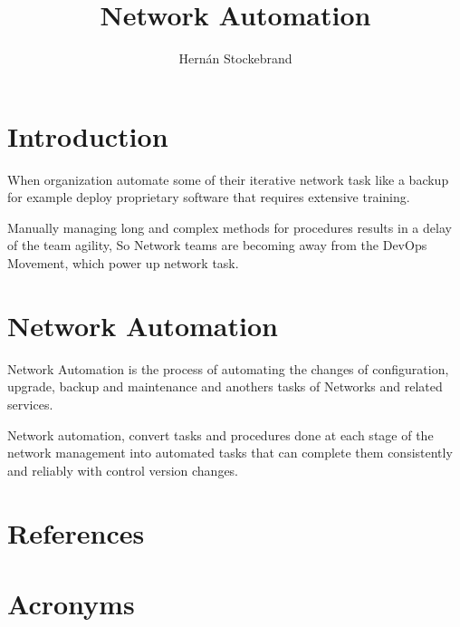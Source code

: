 \documentclass[PMO,lsstdraft,authoryear,toc]{lsstdoc}
\title{Network Automation}
\author{%
Hernán Stockebrand
}
\date{\vcsDate}
\begin{document}
\maketitle

\section{Introduction}

When organization automate some of their iterative network task like a backup for example deploy proprietary software that requires extensive training.

Manually managing long and complex methods for procedures results in a delay of the team agility, So Network teams are becoming away from the DevOps Movement, which power up network task.

\section{Network Automation}

Network Automation is the process of automating the changes of configuration, upgrade, backup and maintenance and anothers tasks of Networks and related services. 

Network automation, convert tasks and procedures done at each stage of the network management into automated tasks that can complete them consistently and reliably with control version changes.





\appendix
\section{References} \label{sec:bib}
\renewcommand{\refname}{} %


\section{Acronyms} \label{sec:acronyms}

\end{document}
